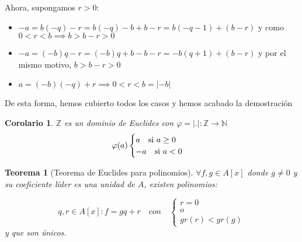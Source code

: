 \documentclass[11pt, a4paper, titlepage]{article}
\makeatletter
\renewenvironment{proof}[1][\proofname] {\vspace{-15pt}\par\pushQED{\qed}\normalfont\topsep6\p@\@plus6\p@\relax\trivlist\item[\hskip\labelsep\it#1\@addpunct{.}]\ignorespaces}{\popQED\endtrivlist\@endpefalse}
\providecommand{\ent}{\mathbb{Z}}
\providecommand{\nat}{\mathbb{N}}
\providecommand{\abs}[1]{\lvert#1\rvert}
\theoremstyle{theorem-style}
\newtheorem*{nth}{Teorema}
\newtheorem{ncor}{Corolario}
\theoremstyle{definition-style}
\theoremstyle{remark-style}
\theoremstyle{example-style}
\makeatother
\begin{document}
\begin{proof}
Ahora, supongamos $r > 0$:

\begin{itemize}
	\item $-a = b(-q) -r = b(-q) -b + b -r = b(-q-1) +(b-r)$ y como $0 < r < b \implies b > b-r > 0$
	\item $-a = (-b)q -r = (-b)q + b - b -r = -b(q+1) + (b-r)$ y por el mismo motivo, $b > b-r > 0$
	\item $a = (-b)(-q) +r \implies 0 < r < b = \abs{-b}$
\end{itemize}

De esta forma, hemos cubierto todos los casos y hemos acabado la demostración
\end{proof}

\begin{ncor}
$\ent$ es un dominio de Euclides con $\varphi = \abs{.}: \ent \to \nat$
\[
\varphi(a) \begin{cases}
	a  \quad \textup{si } a \ge 0\\
	-a \quad \textup{si } a < 0
	
\end{cases}\]
\end{ncor}

\begin{nth}[Teorema de Euclides para polinomios]
		$\forall f,g \in A[x]$ donde $g \neq 0 $ y su coeficiente líder es una unidad de $A$, existen polinomios:
	
	\[
	q,r \in A[x] : f = gq + r \quad con \quad
	 \begin{cases}
		r = 0\\
		o\\
		gr(r) < gr(g)
	\end{cases}
	\]
	y que son únicos.
\end{nth}
\end{document}
